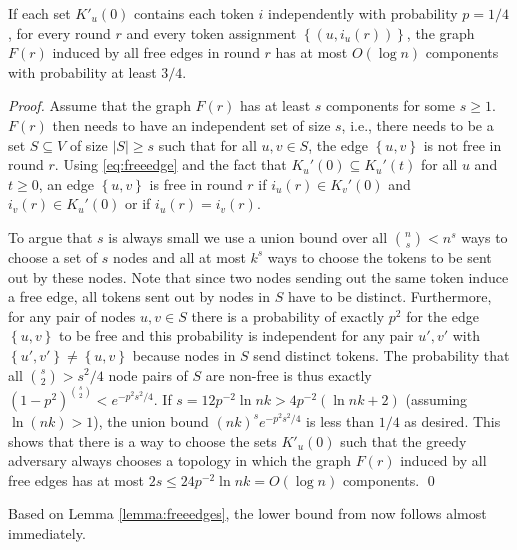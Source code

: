 \documentclass{llncs}
\newcommand{\set}[1]{\left\{#1\right\}}
\begin{document}
\begin{lemma}\label{lemma:freeedges}
    If each set $K'_u(0)$ contains each token $i$ independently with
    probability $p=1/4$, for every round $r$ and every token
    assignment $\set{(u,i_u(r))}$, the graph $F(r)$ induced by all free edges
    in round $r$ has at most $O(\log n)$ components with probability
    at least $3/4$.
\end{lemma}
\begin{proof}
    Assume that the graph $F(r)$ has at least $s$ components for some
    $s\geq 1$. $F(r)$ then needs to have an independent set of size
    $s$, i.e., there needs to be a set $S\subseteq V$ of size $|S|\geq
    s$ such that for all $u,v\in S$, the edge $\set{u,v}$ is not free
    in round $r$. Using \eqref{eq:freeedge} and the fact that
    $K_u'(0)\subseteq K_u'(t)$ for all $u$ and $t\geq 0$, an edge
    $\set{u,v}$ is free in round $r$ if $i_u(r)\in K_v'(0)$ and
    $i_v(r)\in K_u'(0)$ or if $i_u(r)=i_v(r)$. 

    To argue that $s$ is always small we use a union bound over all
    $\binom{n}{s} < n^s$ ways to choose a set of $s$ nodes and all at
    most $k^s$ ways to choose the tokens to be sent out by these
    nodes. Note that since two nodes sending out the same token induce
    a free edge, all tokens sent out by nodes in $S$ have to be
    distinct. Furthermore, for any pair of nodes $u,v \in S$ there is
    a probability of exactly $p^2$ for the edge $\set{u,v}$ to be free
    and this probability is independent for any pair $u',v'$ with
    $\set{u',v'}\neq \set{u,v}$ because nodes in $S$ send distinct
    tokens. The probability that all $\binom{s}{2} > s^2/4$ node pairs
    of $S$ are non-free is thus exactly $(1 - p^2)^{\binom{s}{2}} <
    e^{-p^2 s^2/4}$. If $s = 12 p^{-2} \ln nk > 4p^{-2}(\ln nk + 2)$
    (assuming $\ln(nk)>1$), the union bound $(nk)^s e^{-p^2 s^2/4}$ is
    less than $1/4$ as desired. This shows that there is a way to
    choose the sets $K'_u(0)$ such that the greedy adversary always
    chooses a topology in which the graph $F(r)$ induced by all free
    edges has at most 
$ 2s\leq 24 p^{-2} \ln nk = O(\log n)$
    components.
\hspace*{\fill}\qed\end{proof}

Based on Lemma \ref{lemma:freeedges}, the lower bound from
\cite{LBarxiv} now follows almost immediately.
\end{document}

